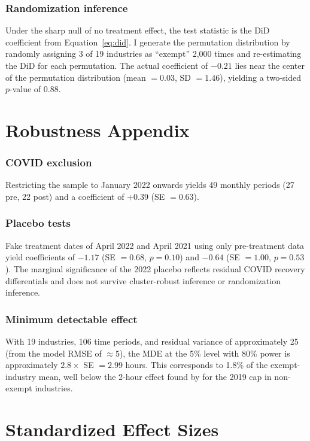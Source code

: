 \documentclass[12pt]{article}
\begin{document}
\subsubsection*{Randomization inference} Under the sharp null of no treatment effect, the test statistic is the DiD coefficient from Equation~\ref{eq:did}. I generate the permutation distribution by randomly assigning 3 of 19 industries as ``exempt'' 2,000 times and re-estimating the DiD for each permutation. The actual coefficient of $-0.21$ lies near the center of the permutation distribution (mean $= 0.03$, SD $= 1.46$), yielding a two-sided $p$-value of 0.88.

\section{Robustness Appendix}

\subsubsection*{COVID exclusion} Restricting the sample to January 2022 onwards yields 49 monthly periods (27 pre, 22 post) and a coefficient of $+0.39$ (SE $= 0.63$).

\subsubsection*{Placebo tests} Fake treatment dates of April 2022 and April 2021 using only pre-treatment data yield coefficients of $-1.17$ (SE $= 0.68$, $p = 0.10$) and $-0.64$ (SE $= 1.00$, $p = 0.53$). The marginal significance of the 2022 placebo reflects residual COVID recovery differentials and does not survive cluster-robust inference or randomization inference.

\subsubsection*{Minimum detectable effect} With 19 industries, 106 time periods, and residual variance of approximately 25 (from the model RMSE of $\approx 5$), the MDE at the 5\% level with 80\% power is approximately $2.8 \times$ SE $= 2.99$ hours. This corresponds to 1.8\% of the exempt-industry mean, well below the 2-hour effect found by \citet{burdin2024} for the 2019 cap in non-exempt industries.

\section{Standardized Effect Sizes}
\label{sec:sde}


\end{document}
